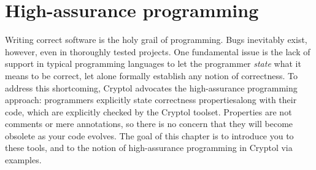 
\chapter{High-assurance programming}
\label{cha:high-assur-progr}

Writing correct software is the holy grail of programming. Bugs
inevitably exist, however, even in thoroughly tested projects.  One
fundamental issue is the lack of support in typical programming
languages to let the programmer \emph{state} what it means to be
correct, let alone formally establish any notion of correctness.  To
address this shortcoming, Cryptol advocates the high-assurance
programming approach: programmers explicitly state correctness
properties\indProperty along with their code, which are explicitly
checked by the Cryptol toolset.  Properties are not comments or mere
annotations, so there is no concern that they will become obsolete as
your code evolves.  The goal of this chapter is to introduce you to
these tools, and to the notion of high-assurance programming in
Cryptol via examples.


